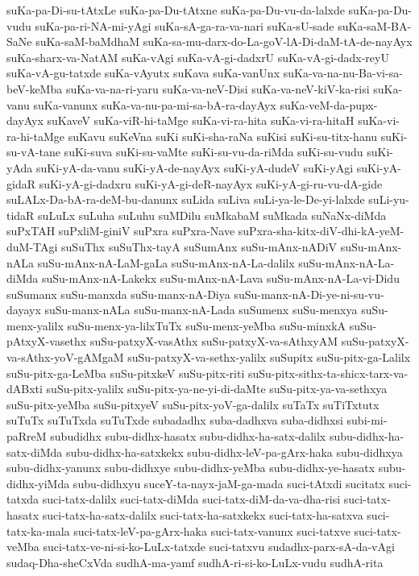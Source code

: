 {suKa-pa-Di-su-tAtxLe
suKa-pa-Du-tAtxne
suKa-pa-Du-vu-da-lalxde
suKa-pa-Du-vudu
suKa-pa-ri-NA-mi-yAgi
suKa-sA-ga-ra-va-nari
suKa-sU-sade
suKa-saM-BA-SaNe
suKa-saM-baMdhaM
suKa-sa-mu-darx-do-La-goV-lA-Di-daM-tA-de-nayAyx
suKa-sharx-va-NatAM
suKa-vAgi
suKa-vA-gi-dadxrU
suKa-vA-gi-dadx-reyU
suKa-vA-gu-tatxde
suKa-vAyutx
suKava
suKa-vanUnx
suKa-va-na-nu-Ba-vi-sa-beV-keMba
suKa-va-na-ri-yaru
suKa-va-neV-Disi
suKa-va-neV-kiV-ka-risi
suKa-vanu
suKa-vanunx
suKa-va-nu-pa-mi-sa-bA-ra-dayAyx
suKa-veM-da-pupx-dayAyx
suKaveV
suKa-viR-hi-taMge
suKa-vi-ra-hita
suKa-vi-ra-hitaH
suKa-vi-ra-hi-taMge
suKavu
suKeVna
suKi
suKi-sha-raNa
suKisi
suKi-su-titx-hanu
suKi-su-vA-tane
suKi-suva
suKi-su-vaMte
suKi-su-vu-da-riMda
suKi-su-vudu
suKi-yAda
suKi-yA-da-vanu
suKi-yA-de-nayAyx
suKi-yA-dudeV
suKi-yAgi
suKi-yA-gidaR
suKi-yA-gi-dadxru
suKi-yA-gi-deR-nayAyx
suKi-yA-gi-ru-vu-dA-gide
suLALx-Da-bA-ra-deM-bu-danunx
suLida
suLiva
suLi-ya-le-De-yi-lalxde
suLi-yu-tidaR
suLuLx
suLuha
suLuhu
suMDilu
suMkabaM
suMkada
suNaNx-diMda
suPxTAH
suPxliM-giniV
suPxra
suPxra-Nave
suPxra-sha-kitx-diV-dhi-kA-yeM-duM-TAgi
suSuThx
suSuThx-tayA
suSumAnx
suSu-mAnx-nADiV
suSu-mAnx-nALa
suSu-mAnx-nA-LaM-gaLa
suSu-mAnx-nA-La-dalilx
suSu-mAnx-nA-La-diMda
suSu-mAnx-nA-Lakekx
suSu-mAnx-nA-Lava
suSu-mAnx-nA-La-vi-Didu
suSumanx
suSu-manxda
suSu-manx-nA-Diya
suSu-manx-nA-Di-ye-ni-su-vu-dayayx
suSu-manx-nALa
suSu-manx-nA-Lada
suSumenx
suSu-menxya
suSu-menx-yalilx
suSu-menx-ya-lilxTuTx
suSu-menx-yeMba
suSu-minxkA
suSu-pAtxyX-vasethx
suSu-patxyX-vasAthx
suSu-patxyX-va-sAthxyAM
suSu-patxyX-va-sAthx-yoV-gAMgaM
suSu-patxyX-va-sethx-yalilx
suSupitx
suSu-pitx-ga-Lalilx
suSu-pitx-ga-LeMba
suSu-pitxkeV
suSu-pitx-riti
suSu-pitx-sithx-ta-shicx-tarx-va-dABxti
suSu-pitx-yalilx
suSu-pitx-ya-ne-yi-di-daMte
suSu-pitx-ya-va-sethxya
suSu-pitx-yeMba
suSu-pitxyeV
suSu-pitx-yoV-ga-dalilx
suTaTx
suTiTxtutx
suTuTx
suTuTxda
suTuTxde
subadadhx
suba-dadhxva
suba-didhxsi
subi-mi-paRreM
subudidhx
subu-didhx-hasatx
subu-didhx-ha-satx-dalilx
subu-didhx-ha-satx-diMda
subu-didhx-ha-satxkekx
subu-didhx-leV-pa-gArx-haka
subu-didhxya
subu-didhx-yanunx
subu-didhxye
subu-didhx-yeMba
subu-didhx-ye-hasatx
subu-didhx-yiMda
subu-didhxyu
suceY-ta-nayx-jaM-ga-mada
suci-tAtxdi
sucitatx
suci-tatxda
suci-tatx-dalilx
suci-tatx-diMda
suci-tatx-diM-da-va-dha-risi
suci-tatx-hasatx
suci-tatx-ha-satx-dalilx
suci-tatx-ha-satxkekx
suci-tatx-ha-satxva
suci-tatx-ka-mala
suci-tatx-leV-pa-gArx-haka
suci-tatx-vanunx
suci-tatxve
suci-tatx-veMba
suci-tatx-ve-ni-si-ko-LuLx-tatxde
suci-tatxvu
sudadhx-parx-sA-da-vAgi
sudaq-Dha-sheCxVda
sudhA-ma-yamf
sudhA-ri-si-ko-LuLx-vudu
sudhA-rita
}
